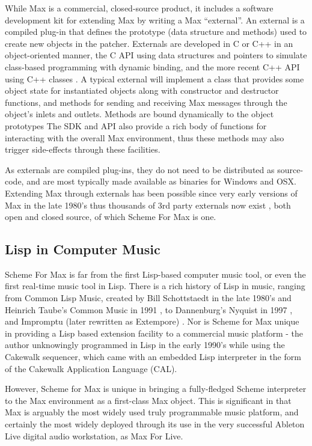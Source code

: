 \documentclass[acmsmall]{acmart}
\begin{document}
While Max is a commercial, closed-source product, it includes a software development kit for 
extending Max by writing a Max “external”. An external is a compiled plug-in that defines the  
prototype (data structure and methods) used to create new objects in the patcher.  
Externals are developed in C or C++ in an object-oriented manner, the C API using data 
structures and pointers to simulate class-based programming with dynamic binding,
and the more recent C++ API using C++ classes \cite{Zicarelli2002}.
A typical external will implement a class that provides some object state for instantiated
objects along with constructor and destructor functions, and  
methods for sending and receiving Max messages through the object’s inlets and outlets.
Methods are bound dynamically to the object prototypes
The SDK and API also provide a rich body of functions for interacting with the overall Max
environment, thus these methods may also trigger side-effects through these facilities.

As externals are compiled plug-ins, they do not need to be distributed as source-code, and
are most typically made available as binaries for Windows and OSX. Extending Max through externals has 
been possible since very early versions of Max in the late 1980's
thus thousands of 3rd party externals 
now exist \cite{MaxObjects2021}, both open and closed source, of which Scheme For Max is one.


\subsection{Lisp in Computer Music}

Scheme For Max is far from the first Lisp-based computer music tool, or even
the first real-time music tool in Lisp. There is a rich history of Lisp in music, 
ranging from Common Lisp Music, created by Bill Schottstaedt in the late 1980's
\cite{Wang17} and Heinrich Taube's Common Music in 1991 \cite{Taube91},
to Dannenburg's Nyquist in 1997 \cite{Dannenberg97},
and Impromptu (later rewritten as Extempore) \cite{Sorensen2010}. 
Nor is Scheme for Max unique in providing a Lisp
based extension facility to a commercial music platform - the author unknowingly
programmed in Lisp in the early 1990's while using the Cakewalk sequencer,
which came with an embedded Lisp interpreter in the form of the 
Cakewalk Application Language (CAL).

However, Scheme for Max is unique in bringing a fully-fledged Scheme interpreter
to the Max environment as a first-class Max object. This is significant in that Max
is arguably the most widely used truly programmable
music platform, and certainly the most widely deployed through its use in 
the very successful Ableton Live digital audio workstation, as Max For Live.
\end{document}
